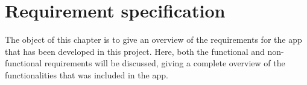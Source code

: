\chapter{Requirement specification}
\label{sec:recSpecification}

The object of this chapter is to give an overview of the requirements for the app that has been developed in this project. Here, both the functional and non-functional requirements will be discussed, giving a complete overview of the functionalities that was included in the app.



\newpage

